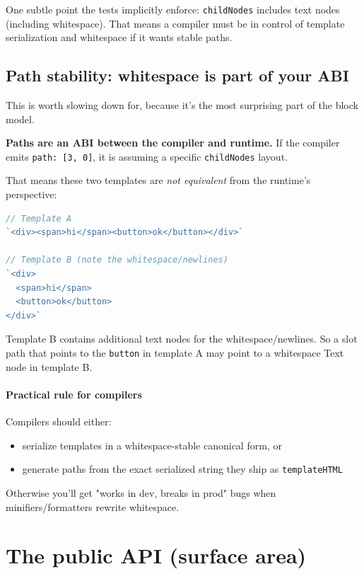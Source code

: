One subtle point the tests implicitly enforce: \texttt{childNodes} includes text nodes (including whitespace). That means a compiler must be in control of template serialization and whitespace if it wants stable paths.

\subsection{Path stability: whitespace is part of your ABI}

This is worth slowing down for, because it's the most surprising part of the block model.

	\textbf{Paths are an ABI between the compiler and runtime.}
If the compiler emits \texttt{path: [3, 0]}, it is assuming a specific \texttt{childNodes} layout.

That means these two templates are \emph{not equivalent} from the runtime's perspective:

\begin{lstlisting}[language=JavaScript]
// Template A
`<div><span>hi</span><button>ok</button></div>`

// Template B (note the whitespace/newlines)
`<div>
  <span>hi</span>
  <button>ok</button>
</div>`
\end{lstlisting}

Template B contains additional text nodes for the whitespace/newlines.
So a slot path that points to the \texttt{button} in template A may point to a whitespace Text node in template B.

\paragraph{Practical rule for compilers}

Compilers should either:

\begin{itemize}
  \item serialize templates in a whitespace-stable canonical form, or
  \item generate paths from the exact serialized string they ship as \texttt{templateHTML}
\end{itemize}

Otherwise you'll get "works in dev, breaks in prod" bugs when minifiers/formatters rewrite whitespace.

\section{The public API (surface area)}

